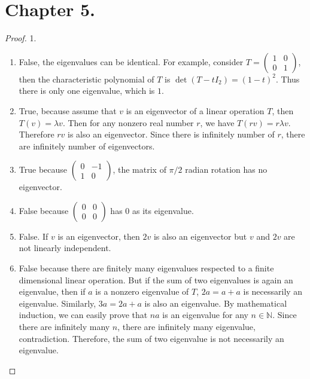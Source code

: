 \documentclass[12pt, a4paper]{article}
\theoremstyle{plain}
\newcommand{\N}{\mathbb{N}}
\begin{document}
\pagebreak

\section*{Chapter 5.}

\begin{proof}
1. \begin{enumerate}[label=(\alph*)]
    \item False, the eigenvalues can be identical. For example, consider $T=\begin{pmatrix}
    1&0\\
    0&1
    \end{pmatrix}$, then the characteristic polynomial of $T$ is $\det(T-tI_2)=(1-t)^2$. Thus there is only one eigenvalue, which is $1$.
    
    \item
    True, because assume that $v$ is an eigenvector of a linear operation $T$, then $T(v)=\lambda v$. Then for any nonzero real number $r$, we have $T(rv)=r\lambda v$. Therefore $rv$ is also an eigenvector. Since there is infinitely number of $r$, there are infinitely number of eigenvectors.
    
    \item True because $\begin{pmatrix}
    0&-1\\
    1&0
    \end{pmatrix}$, the matrix of $\pi/2$ radian rotation has no eigenvector.
    
    \item False because $\begin{pmatrix}
    0&0\\
    0&0
    \end{pmatrix}$ has $0$ as its eigenvalue.
    
    \item False. If $v$ is an eigenvector, then $2v$ is also an eigenvector but $v$ and $2v$ are not linearly independent.
    
    \item False because there are finitely many eigenvalues respected to a finite dimensional linear operation. But if the sum of two eigenvalues is again an eigenvalue, then if $a$ is a nonzero eigenvalue of $T$, $2a=a+a$ is necessarily an eigenvalue. Similarly, $3a=2a+a$ is also an eigenvalue. By mathematical induction, we can easily prove that $na$ is an eigenvalue for any $n\in\N$. Since there are infinitely many $n$, there are infinitely many eigenvalue, contradiction. Therefore, the sum of two eigenvalue is not necessarily an eigenvalue.
    

\end{enumerate}
\end{proof}
\end{document}
